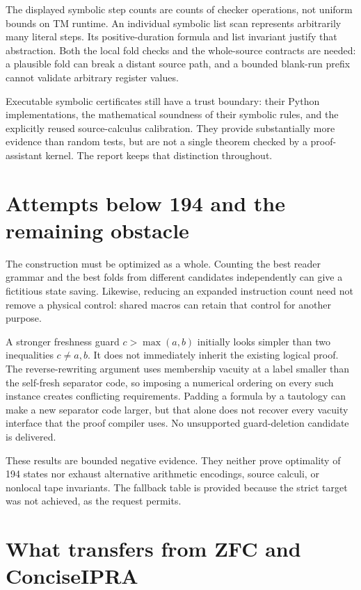 \documentclass[11pt,letterpaper]{article}
\begin{document}
The displayed symbolic step counts are counts of checker operations, not
uniform bounds on TM runtime. An individual symbolic list scan represents
arbitrarily many literal steps. Its positive-duration formula and list
invariant justify that abstraction. Both the local fold checks and the
whole-source contracts are needed: a plausible fold can break a distant
source path, and a bounded blank-run prefix cannot validate arbitrary
register values.

Executable symbolic certificates still have a trust boundary: their Python
implementations, the mathematical soundness of their symbolic rules, and
the explicitly reused source-calculus calibration. They provide substantially
more evidence than random tests, but are not a single theorem checked by a
proof-assistant kernel. The report keeps that distinction throughout.

\section{Attempts below 194 and the remaining obstacle}\label{sec:search}



The construction must be optimized as a whole. Counting the best reader
grammar and the best folds from different candidates independently can give
a fictitious state saving. Likewise, reducing an expanded instruction count
need not remove a physical control: shared macros can retain that control
for another purpose.

A stronger freshness guard \(c>\max(a,b)\) initially looks simpler than
two inequalities \(c\ne a,b\). It does not immediately inherit the existing
logical proof. The reverse-rewriting argument uses membership vacuity at
a label smaller than the self-fresh separator code, so imposing a numerical
ordering on every such instance creates conflicting requirements. Padding a
formula by a tautology can make a new separator code larger, but that alone
does not recover every vacuity interface that the proof compiler uses.
No unsupported guard-deletion candidate is delivered.

These results are bounded negative evidence. They neither prove optimality
of 194 states nor exhaust alternative arithmetic encodings, source calculi,
or nonlocal tape invariants. The fallback table is provided because the
strict target was not achieved, as the request permits.

\section{What transfers from ZFC and ConciseIPRA}
\end{document}
